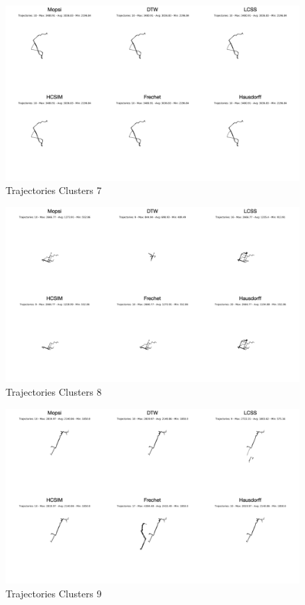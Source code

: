 \documentclass[a4paper, 12pt]{article}
\begin{document}
\begin{figure}[htbp!]
    \centering
    \includegraphics[width=1\textwidth]{Mopsi Clusters 7.png}
    \caption{Trajectories Clusters 7}
    \label{fig33}
\end{figure}

\begin{figure}[htbp!]
    \centering
    \includegraphics[width=1\textwidth]{Mopsi Clusters 8.png}
    \caption{Trajectories Clusters 8}
    \label{fig34}
\end{figure}

\begin{figure}[htbp!]
    \centering
    \includegraphics[width=1\textwidth]{Mopsi Clusters 9.png}
    \caption{Trajectories Clusters 9}
    \label{fig35}
\end{figure}
\end{document}
